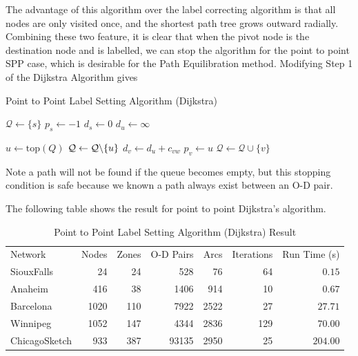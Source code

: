 The advantage of this algorithm over the label correcting algorithm is
that all nodes are only visited once,
and the shortest path tree grows outward radially.
Combining these two feature,
it is clear that when the pivot node is the destination node and is 
labelled,
we can stop the algorithm for the point to point SPP case,
which is desirable for the Path Equilibration method.
Modifying Step 1 of the Dijkstra Algorithm gives

\begin{algorithm}
    \caption{Point to Point Label Setting Algorithm (Dijkstra)}
    \begin{algorithmic}[1]
        \State $\mathcal{Q} \gets \{s\}$ 
        \State $p_s \gets -1$
        \State $d_s \gets 0$
         
            \State $d_u \gets \infty$
        \EndFor

            \State $ u \gets \text{top}(Q) $
            \State $ \mathcal{Q} \gets \mathcal{Q} \char`\\ \{u\} $
                \State {}
            \EndIf
             
                        \State $d_v \gets d_u + c_{vw}$
                        \State $p_v \gets u$
                        \State $\mathcal{Q} \gets \mathcal{Q} \cup \{v\}$
                    \EndIf
                \EndFor
            \EndIf
        \EndWhile
        \EndProcedure
    \end{algorithmic}
\end{algorithm}
Note a path will not be found if the queue becomes empty,
but this stopping condition is safe because we known a path
always exist between an O-D pair.

The following table shows the result for point to point Dijkstra's algorithm.
\begin{table}[H]
    \centering
    \begin{tabular}{lrrrrrr}
        Network & Nodes & Zones & O-D Pairs & Arcs  & Iterations & Run Time (s) \\
        SiouxFalls    & 24   & 24  & 528   & 76     & 64         & $ 0.15 $     \\
        Anaheim       & 416  & 38  & 1406  & 914    & 10         & $ 0.67 $     \\
        Barcelona     & 1020 & 110 & 7922  & 2522   & 27         & $ 27.71$     \\
        Winnipeg      & 1052 & 147 & 4344  & 2836   & 129        & $ 70.00  $   \\
        ChicagoSketch & 933  & 387 & 93135 & 2950   & 25         & $ 204.00  $ 
    \end{tabular}
    \caption{Point to Point Label Setting Algorithm (Dijkstra) Result}
\end{table}

